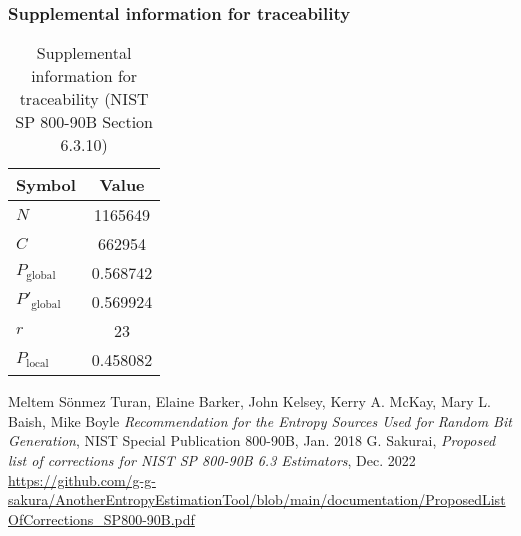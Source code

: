 \documentclass[a3paper,xelatex,english]{bxjsarticle}
\begin{document}
\subsubsection{Supplemental information for traceability}
\renewcommand{\arraystretch}{1.8}
\begin{table}[h]
\caption{Supplemental information for traceability (NIST SP 800-90B Section 6.3.10)}
\begin{center}
\begin{tabular}{|l|c|}
\hline 
\rowcolor{anotherlightblue} %
Symbol				& Value \\ \hline 
$N$				& 1165649\\ \hline 
$C$				& 662954\\ \hline 
$P_{\textrm{global}}$				& 0.568742\\ \hline 
$P'_{\textrm{global}}$			& 0.569924\\ \hline 
$r$				& 23\\ \hline 
$P_{\textrm{local}}$ 			& 0.458082\\ \hline
\end{tabular}
\end{center}
\end{table}
\renewcommand{\arraystretch}{1.4}
\begin{thebibliography}{99}
Meltem S\"{o}nmez Turan,
Elaine Barker,
John Kelsey,
Kerry A. McKay,
Mary L. Baish,
Mike Boyle
\textit{Recommendation for the Entropy Sources Used for Random Bit Generation},
NIST Special Publication 800-90B, Jan. 2018
G. Sakurai, \textit{Proposed list of corrections for NIST SP 800-90B 6.3 Estimators}, Dec. 2022
\url{https://github.com/g-g-sakura/AnotherEntropyEstimationTool/blob/main/documentation/ProposedListOfCorrections_SP800-90B.pdf}
\end{thebibliography}
\end{document}
